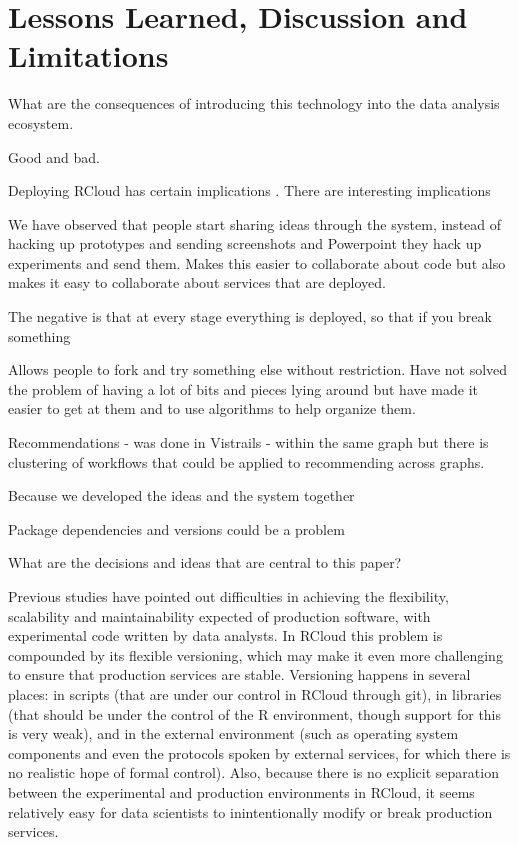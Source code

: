 \section{Lessons Learned, Discussion and Limitations}

What are the consequences of introducing this technology into the
data analysis ecosystem. 


Good and bad.

Deploying RCloud has certain implications .
There are interesting implications

We have observed that people start sharing ideas through the system,
instead of hacking up prototypes and sending screenshots and Powerpoint
they hack up experiments and send them. Makes this easier to collaborate
about code but also makes it easy to collaborate about services that are
deployed.

The negative is that at every stage everything is deployed, so that if
you break something

Allows people to fork and try something else without restriction.
Have not solved the problem of having a lot of bits and pieces lying around
but have made it easier to get at them and to use algorithms to 
help organize them.

Recommendations - was done in Vistrails - within the same graph but
there is clustering of workflows that could be applied to recommending
across graphs.

Because we developed the ideas and the system together 

Package dependencies and versions could be a problem


What are the decisions and ideas that are central to this paper?

Previous studies have pointed out difficulties in achieving the flexibility,
scalability and maintainability expected of production software,
with experimental code written by data analysts. In RCloud this problem
is compounded by its flexible versioning, which may make it even
more challenging to ensure that production services are stable.
Versioning happens in several places: in scripts (that are under
our control in RCloud through git), in libraries (that should be
under the control of the R environment, though support for this
is very weak), and in the external environment
(such as operating system components and even the protocols
spoken by external services, for which there is no realistic
hope of formal control).  
Also, because there is no explicit separation between the experimental
and production environments in RCloud, it seems relatively easy for
data scientists to inintentionally modify or break production services.

